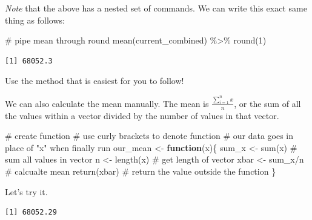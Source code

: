 \documentclass[
  letterpaper,
  DIV=11,
  numbers=noendperiod]{scrreprt}
\newenvironment{Shaded}{\begin{snugshade}}{\end{snugshade}}
\newcommand{\CommentTok}[1]{\textcolor[rgb]{0.37,0.37,0.37}{#1}}
\newcommand{\ControlFlowTok}[1]{\textcolor[rgb]{0.00,0.23,0.31}{\textbf{#1}}}
\newcommand{\DecValTok}[1]{\textcolor[rgb]{0.68,0.00,0.00}{#1}}
\newcommand{\FunctionTok}[1]{\textcolor[rgb]{0.28,0.35,0.67}{#1}}
\newcommand{\NormalTok}[1]{\textcolor[rgb]{0.00,0.23,0.31}{#1}}
\newcommand{\OtherTok}[1]{\textcolor[rgb]{0.00,0.23,0.31}{#1}}
\newcommand{\SpecialCharTok}[1]{\textcolor[rgb]{0.37,0.37,0.37}{#1}}
\begin{document}
\emph{Note} that the above has a nested set of commands. We can write
this exact same thing as follows:

\begin{Shaded}
\begin{Highlighting}[]
\CommentTok{\# pipe mean through round}
\FunctionTok{mean}\NormalTok{(current\_combined) }\SpecialCharTok{\%\textgreater{}\%}
  \FunctionTok{round}\NormalTok{(}\DecValTok{1}\NormalTok{)}
\end{Highlighting}
\end{Shaded}

\begin{verbatim}
[1] 68052.3
\end{verbatim}

Use the method that is easiest for you to follow!

We can also calculate the mean manually. The mean is
\(\frac{\sum_{i=1}^nx}{n}\), or the sum of all the values within a
vector divided by the number of values in that vector.

\begin{Shaded}
\begin{Highlighting}[]
\CommentTok{\# create function}
\CommentTok{\# use curly brackets to denote function}
\CommentTok{\# our data goes in place of "x" when finally run}
\NormalTok{our\_mean }\OtherTok{\textless{}{-}} \ControlFlowTok{function}\NormalTok{(x)\{}
\NormalTok{  sum\_x }\OtherTok{\textless{}{-}} \FunctionTok{sum}\NormalTok{(x) }\CommentTok{\# sum all values in vector}
\NormalTok{  n }\OtherTok{\textless{}{-}} \FunctionTok{length}\NormalTok{(x) }\CommentTok{\# get length of vector}
\NormalTok{  xbar }\OtherTok{\textless{}{-}}\NormalTok{ sum\_x}\SpecialCharTok{/}\NormalTok{n }\CommentTok{\# calcualte mean}
  \FunctionTok{return}\NormalTok{(xbar) }\CommentTok{\# return the value outside the function}
\NormalTok{\}}
\end{Highlighting}
\end{Shaded}

Let's try it.

\begin{Shaded}
\end{Shaded}

\begin{verbatim}
[1] 68052.29
\end{verbatim}
\end{document}
